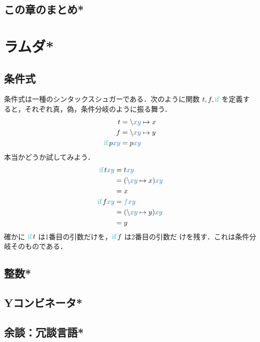 \documentclass[a5paper,twoside,fleqn,draft]{jsbook}
\begin{document}
\section{この章のまとめ*}


\chapter{ラムダ*}
\label{ch:lambda}

\section{条件式}

条件式は一種のシンタックスシュガーである．次のように関数
$t,f,\mIfFunc$ を定義すると，それぞれ真，偽，条件分岐のように振る舞う．
\begin{align}
t&=\hLambdaSyntax{\hVar{x}\hVar{y}}{x}\\
f&=\hLambdaSyntax{\hVar{x}\hVar{y}}{y}\\
\mIfFunc p\hVar{x}\hVar{y}&=p\hVar{x}\hVar{y}
\end{align}
本当かどうか試してみよう．
\begin{align}
\mIfFunc t\hVar{x}\hVar{y}&=t\hVar{x}\hVar{y}\\
&=(\hLambdaSyntax{\hVar{x}\hVar{y}}{x})\hVar{x}\hVar{y}\\
&=x\\
\mIfFunc f\hVar{x}\hVar{y}&=\hFunc{f}\hVar{x}\hVar{y}\\
&=(\hLambdaSyntax{\hVar{x}\hVar{y}}{y})\hVar{x}\hVar{y}\\
&=y
\end{align}
確かに $\mIfFunc t$ は1番目の引数だけを，$\mIfFunc f$ は2番目の引数だ
けを残す．これは条件分岐そのものである．

\section{整数*}
\section{Yコンビネータ*}


\section{余談：冗談言語*}

\end{document}
